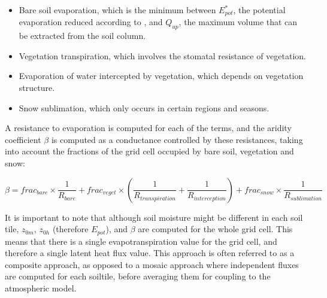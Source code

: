 \begin{itemize}
    \item Bare soil evaporation, which is the minimum between $E_{pot}^*$, the potential evaporation reduced according to \citet{milly_potential_1992}, and $Q_{up}$, the maximum volume that can be extracted from the soil column.
    \item Vegetation transpiration, which involves the stomatal resistance of vegetation.
    \item Evaporation of water intercepted by vegetation, which depends on vegetation structure.
    \item Snow sublimation, which only occurs in certain regions and seasons.
\end{itemize}

A resistance to evaporation is computed for each of the terms, and the aridity coefficient $\beta$ is computed as a conductance controlled by these resistances, taking into account the fractions of the grid cell occupied by bare soil, vegetation and snow:

\begin{equation}
    \beta = frac_{bare} \times \frac{1}{R_{bare}} + frac_{veget} \times ( \frac{1}{R_{transpiration}} + \frac{1}{R_{interception}} ) + frac_{snow} \times  \frac{1}{R_{sublimation}}
\end{equation}

It is important to note that although soil moisture might be different in each soil tile, $z_{0m}$, $z_{0h}$ (therefore $E_{pot}$), and $\beta$ are computed for the whole grid cell. This means that there is a single evapotranspiration value for the grid cell, and therefore a single latent heat flux value.
This approach is often referred to as a composite approach, as opposed to a mosaic approach where independent fluxes are computed for each soiltile, before averaging them for coupling to the atmospheric model. %


